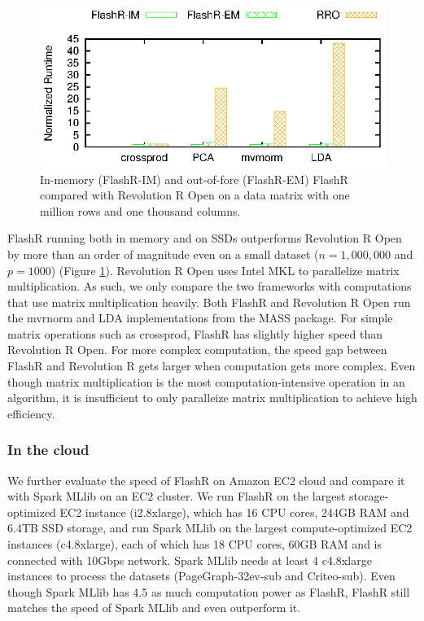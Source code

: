 \begin{figure}[b]
  \vspace{-10pt}
	\begin{center}
		\footnotesize
		\includegraphics{FlashMatrix_figs/FlashR-vs-RRO.eps}
		\caption{In-memory (FlashR-IM) and out-of-fore (FlashR-EM) FlashR
		compared with Revolution R Open on a data matrix with one million rows
		and one thousand columns.}
		\label{fig:fmR}
	\end{center}
  \vspace{-15pt}
\end{figure}

FlashR running both in memory and on SSDs outperforms Revolution R Open by more
than an order of magnitude even on a small dataset ($n=1,000,000$ and $p=1000$)
(Figure \ref{fig:fmR}).
Revolution R Open uses Intel MKL to parallelize matrix multiplication. As such,
we only compare the two frameworks with computations that use matrix
multiplication heavily. Both FlashR and Revolution R Open run the mvrnorm
and LDA implementations from the MASS package. For simple matrix operations such as crossprod,
FlashR has slightly higher speed than Revolution R Open. For more complex
computation, the speed gap between FlashR and Revolution R gets larger when
computation gets more complex. Even though matrix multiplication
is the most computation-intensive operation in an algorithm, it is insufficient
to only paralleize matrix multiplication to achieve high efficiency.

\subsubsection{In the cloud}

We further evaluate the speed of FlashR on Amazon EC2 cloud and compare it with
Spark MLlib on an EC2 cluster. We run FlashR on the largest storage-optimized
EC2 instance (i2.8xlarge), which has 16 CPU cores, 244GB RAM and 6.4TB SSD storage,
and run Spark MLlib on the largest compute-optimized EC2 instances (c4.8xlarge),
each of which has 18 CPU cores, 60GB RAM and is connected with 10Gbps network.
Spark MLlib needs at least 4 c4.8xlarge instances to process the datasets
(PageGraph-32ev-sub and Criteo-sub).
Even though Spark MLlib has 4.5 as much computation power as FlashR, FlashR
still matches the speed of Spark MLlib and even outperform it.


